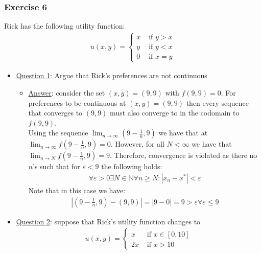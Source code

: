 \documentclass{article}
\begin{document}
\subsubsection{Exercise 6}
Rick has the following utility function:
\begin{gather*}
  u(x,y) =
  \begin{cases}
    x & \text{ if } y > x \\
    y & \text{ if } y < x \\
    0 & \text{ if } x = y
   \end{cases}
\end{gather*}
\par \vspace{0.3em}
\begin{itemize}
  \item  \underline{Question 1}: Argue that Rick's preferences are not continuous
  \begin{itemize}
    \item  \underline{Answer}: consider the set $(x,y) = (9,9)$ with $f(9,9) = 0$. For preferences to be continuous at $(x,y) = (9,9)$ then every sequence that converges to $(9,9)$ must also converge to in the codomain to $f(9,9)$.\\ Using the sequence $\lim_{n \rightarrow \infty} (9 - \tfrac{1}{n}, 9)$ we have that at $\lim_{n \rightarrow \infty} f(9 - \tfrac{1}{n}, 9) = 0$. However, for all $N < \infty$ we have that $\lim_{n \rightarrow N} f(9 - \tfrac{1}{n}, 9) = 9$. Therefore, convergence is violated as there no $n$'s such that for $\varepsilon < 9$ the following holds:
    \begin{gather*}
      \forall \varepsilon > 0 \exists N \in \mathbb{N} \forall n \geq N: |x_{n} - x^{*}| < \varepsilon
    \end{gather*}
    Note that in this case we have:
    \begin{gather*}
      |(9 - \frac{1}{n}, 9) - (9, 9)| = |9 - 0| = 9 > \varepsilon \forall \varepsilon \leq 9
    \end{gather*}
  \end{itemize}
  \item  \underline{Question 2}: suppose that Rick's utility function changes to
  \begin{gather*}
    u(x,y) =
    \begin{cases}
      x & \text{ if } x \in [0,10] \\
      2x & \text{ if } x > 10
     \end{cases}
  \end{gather*}

\end{itemize}
\end{document}
